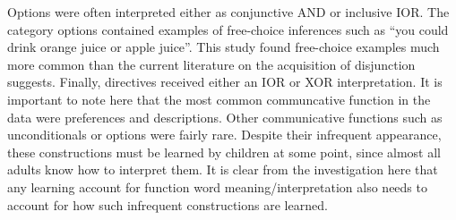\documentclass[oneside]{report}
\theoremstyle{definition}
\theoremstyle{definition}
\theoremstyle{definition}
\theoremstyle{remark}
\begin{document}
Options were often interpreted either as conjunctive AND or inclusive
IOR. The category options contained examples of free-choice inferences
such as ``you could drink orange juice or apple juice''. This study
found free-choice examples much more common than the current literature
on the acquisition of disjunction suggests. Finally, directives received
either an IOR or XOR interpretation. It is important to note here that
the most common communcative function in the data were preferences and
descriptions. Other communicative functions such as unconditionals or
options were fairly rare. Despite their infrequent appearance, these
constructions must be learned by children at some point, since almost
all adults know how to interpret them. It is clear from the
investigation here that any learning account for function word
meaning/interpretation also needs to account for how such infrequent
constructions are learned.
\end{document}

